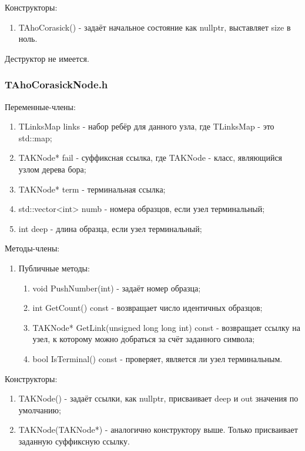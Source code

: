 \documentclass[12pt]{article}
\begin{document}
Конструкторы:
\begin{enumerate}
	\item TAhoCorasick() - задаёт начальное состояние как nullptr, выставляет size в ноль.
\end{enumerate}

Деструктор не имеется.

\subsubsection*{TAhoCorasickNode.h}

Переменные-члены:
\begin{enumerate}
	\item TLinksMap links - набор ребёр для данного узла, где TLinksMap - это std::map;
	\item TAKNode*  fail - суффиксная ссылка, где TAKNode - класс, являющийся узлом дерева бора;
	\item TAKNode*  term - терминальная ссылка;
	\item std::vector<int> numb - номера образцов, если узел терминальный;
	\item int deep - длина образца, если узел терминальный;
\end{enumerate}

Методы-члены:
\begin{enumerate}
	\item Публичные методы:
	\begin{enumerate}
		\item void PushNumber(int) - задаёт номер образца;
		\item int GetCount() const - возвращает число идентичных образцов;
		\item TAKNode* GetLink(unsigned long long int) const - возвращает ссылку на узел, к которому можно добраться за счёт заданного символа;
		\item bool IsTerminal() const - проверяет, является ли узел терминальным.
	\end{enumerate}
\end{enumerate}


Конструкторы:
\begin{enumerate}
	\item TAKNode() - задаёт ссылки, как nullptr, присваивает deep и out значения по умолчанию;
	\item TAKNode(TAKNode*) - аналогично конструктору выше. Только присваивает заданную суффиксную ссылку.
\end{enumerate}
\end{document}
